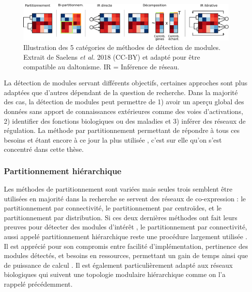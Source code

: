 \begin{figure}[h!]
    \centering
    \includegraphics[width=\textwidth]{img/intro/3_coexpr/intro_3_coexpr_category_detection_module.pdf}
    \caption[Illustration des 5 catégories de méthodes de détection de modules.]{Illustration des 5 catégories de méthodes de détection de modules. Extrait de Saelens \textit{et al.} 2018 (CC-BY) \cite{Saelens2018} et adapté pour être compatible au daltonisme. IR = Inférence de réseau.}
    \label{fig:my_label}
\end{figure}

La détection de modules servant différents objectifs, certaines approches sont plus adaptées que d'autres dépendant de la question de recherche. Dans la majorité des cas, la détection de modules peut permettre de 1) avoir un aperçu global des données sans apport de connaissances extérieures comme des voies d'activations, 2) identifier des fonctions biologiques ou des maladies et 3) inférer des réseaux de régulation. La méthode par partitionnement permettant de répondre à tous ces besoins \cite{Filteau2013,Sundarrajan2016,Kogelman2014} et étant encore à ce jour la plus utilisée \cite{Saelens2018}, c'est sur elle qu'on s'est concentré dans cette thèse.

\subsubsection{Partitionnement hiérarchique}

Les méthodes de partitionnement sont variées mais seules trois semblent être utilisées en majorité dans la recherche se servent des réseaux de co-expression : le partitionnement par connectivité, le partitionnement par centroïdes, et le partitionnement par distribution. Si ces deux dernières méthodes ont fait leurs preuves pour détecter des modules d'intérêt \cite{Ruan2006Dec,Shi2010Dec, Rau2018}, le partitionnement par connectivité, aussi appelé partitionnement hiérarchique reste une procédure largement utilisée \cite{Tang2018, Mao2009, Rotival2013}. Il est apprécié pour son compromis entre facilité d'implémentation, pertinence des modules détectés, et besoins en ressources, permettant un gain de temps ainsi que de puissance de calcul \cite{Saelens2018}. Il est également particulièrement adapté aux réseaux biologiques qui suivent une topologie modulaire hiérarchique comme on l'a rappelé précédemment. 

